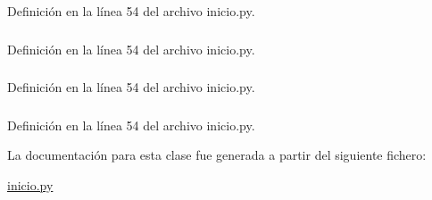Definición en la línea 54 del archivo inicio.py.

\hypertarget{classinicio_1_1prueba__adqui_a32103b146bd571e752923638e680db8b}{
\subsubsection[{teleoper}]{}}
\label{classinicio_1_1prueba__adqui_a32103b146bd571e752923638e680db8b}


Definición en la línea 54 del archivo inicio.py.

\hypertarget{classinicio_1_1prueba__adqui_ac00108c4677fe544c8a187c120369d27}{
\subsubsection[{texto\_\-datos}]{}}
\label{classinicio_1_1prueba__adqui_ac00108c4677fe544c8a187c120369d27}


Definición en la línea 54 del archivo inicio.py.

\hypertarget{classinicio_1_1prueba__adqui_a960901fb7d1086379f6c3de6076b7fab}{
\subsubsection[{texto\_\-datos\_\-sonar}]{}}
\label{classinicio_1_1prueba__adqui_a960901fb7d1086379f6c3de6076b7fab}


Definición en la línea 54 del archivo inicio.py.



La documentación para esta clase fue generada a partir del siguiente fichero:\begin{DoxyCompactItemize}
\item 
\hyperlink{inicio_8py}{inicio.py}\end{DoxyCompactItemize}

